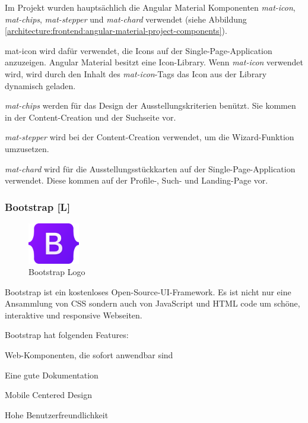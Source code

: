 Im Projekt wurden hauptsächlich die Angular Material Komponenten \emph{mat-icon}, \emph{mat-chips}, \emph{mat-stepper} und \emph{mat-chard} verwendet (siehe Abbildung \ref{architecture:frontend:angular-material-project-components}).

{mat-icon} wird dafür verwendet, die Icons auf der Single-Page-Application anzuzeigen. Angular Material besitzt eine Icon-Library. Wenn \emph{mat-icon} verwendet wird, wird durch den Inhalt des \emph{mat-icon}-Tags das Icon aus der Library dynamisch geladen.

\emph{mat-chips} werden für das Design der Ausstellungskriterien benützt. Sie kommen in der Content-Creation und der Suchseite vor.

\emph{mat-stepper} wird bei der Content-Creation verwendet, um die Wizard-Funktion umzusetzen.

\emph{mat-chard} wird für die Ausstellungsstückkarten auf der Single-Page-Application verwendet. Diese kommen auf der Profile-, Such- und Landing-Page vor.

\subsubsection{Bootstrap [L]}
\begin{figure}
  \begin{center}
    \includegraphics[width=0.2\textwidth]{pics/Bootstrap_logo.png}
   \caption{Bootstrap Logo}
  \end{center}
\end{figure}
Bootstrap ist ein kostenloses Open-Source-UI-Framework. Es ist nicht nur eine Ansammlung von CSS sondern auch von JavaScript und HTML code um schöne, interaktive und responsive Webseiten.  \cite{BestCSSFrameworksin2022}

Bootstrap hat folgenden Features:  \cite{BestCSSFrameworksin2022}
\begin{compactitem}
    \item Web-Komponenten, die sofort anwendbar sind
    \item Eine gute Dokumentation
    \item Mobile Centered Design
    \item Hohe Benutzerfreundlichkeit
\end{compactitem}

